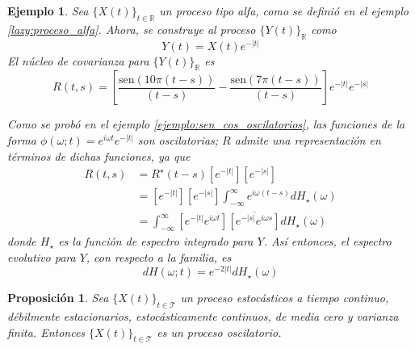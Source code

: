 \documentclass[12pt,letterpaper]{book}
\newtheorem{proposicion}[teorema]{Proposición}
\newtheorem{ejemplo}{Ejemplo}[chapter]
\newcommand{\R}{\mathbb{R}}
\newcommand{\intR}{\int_{-\infty}^{\infty}}
\newcommand{\SEN}[1]{\mathrm{sen}\left( #1 \right)}
\newcommand{\abso}[1]{\left| #1 \right|}
\newcommand{\xt}{$\{X(t)\}_{t\in \mathcal{T}}$ }
\newcommand{\xtin}[1]{$\{X(t)\}_{t\in \mathcal{ #1 }}$ }
\begin{document}
\begin{ejemplo}
Sea \xtin{\R} un proceso tipo alfa, como se definió en el ejemplo \ref{lazy:proceso_alfa}. 
%
Ahora, se construye al proceso $\{Y(t)\}_{\R}$ como
\begin{equation}
Y(t) = X(t) e^{-\abso{t}}
\end{equation}
%
El núcleo de covarianza para $\{Y(t)\}_{\R}$ es
\begin{equation}
R(t,s) = \left[ \frac{\SEN{10 \pi (t-s)}}{(t-s)} - \frac{\SEN{7 \pi (t-s)}}{(t-s)} \right] e^{-\abso{t} } e^{-\abso{s}}
\end{equation}

Como se probó en el ejemplo \ref{ejemplo:sen_cos_oscilatorios}, las funciones de la forma $\phi(\omega; t) = e^{i \omega t} e^{-\abso{t}}$ son oscilatorias; $R$ admite una representación en términos de dichas funciones, ya que
\begin{align*}
R(t,s) &= R^\star(t-s) \left[e^{-\abso{t}}\right] \left[ e^{-\abso{s}} \right] \\
&= \left[e^{-\abso{t}}\right] \left[ e^{-\abso{s}} \right] \intR e^{i \omega (t-s)} dH_\star(\omega) \\
&= \intR \left[e^{-\abso{t}} e^{i \omega t} \right] \overline{\left[ e^{-\abso{s}} e^{i \omega s} \right]}  dH_\star(\omega)
\end{align*}
donde $H_\star$ es la función de espectro integrado para $Y$. Así entonces, el espectro evolutivo para $Y$, con respecto a la familia, es
\begin{equation}
dH(\omega;t) = e^{- 2 \abso{t}} dH_\star(\omega)
\end{equation}
\end{ejemplo}

\begin{proposicion}
Sea \xt un proceso estocásticos a tiempo continuo, débilmente estacionarios, estocásticamente continuos, de media cero y varianza finita.
%
Entonces \xt es un proceso oscilatorio.
\end{proposicion}
\end{document}
